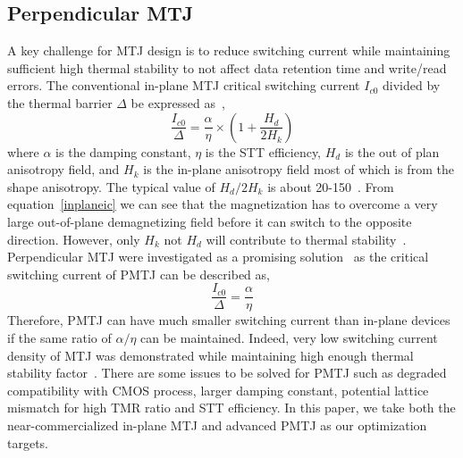 \subsection{Perpendicular MTJ} \label{subsec:pmtj}
A key challenge for MTJ design is to reduce switching current while maintaining sufficient high thermal stability to not affect data retention time and write/read errors. The conventional in-plane MTJ critical switching current $I_{c0}$ divided by the thermal barrier $\Delta$ be expressed as~\cite{PMTJ:Grandis10},
\begin{equation}
\frac{I_{c0}}{\Delta} = \frac{\alpha}{\eta} \times (1+\frac{H_{d}}{2H_{k}})
\label{inplaneic}
\end{equation}
where $\alpha$ is the damping constant, $\eta$ is the STT efficiency, $H_{d}$ is the out of plan anisotropy field, and $H_{k}$ is the in-plane anisotropy field most of which is from the shape anisotropy. The typical value of $H_{d}/2H_{k}$ is about 20-150~\cite{STTRAM:Review10A}. From equation~\ref{inplaneic} we can see that the magnetization has to overcome a very large out-of-plane demagnetizing field before it can switch to the opposite direction. However, only $H_{k}$ not $H_{d}$ will contribute to thermal stability~\cite{PMTJ:Grandis10}. Perpendicular MTJ were investigated as a promising solution~\cite{PMTJ:APL06,PMTJ:Grandis10,PMTJ:Toshiba08,PMTJ:Xiaochun06} as the critical switching current of PMTJ can be described as,
\begin{equation}
\frac{I_{c0}}{\Delta} = \frac{\alpha}{\eta}
\label{PMTJic}
\end{equation}
Therefore, PMTJ can have much smaller switching current than in-plane devices if the same ratio of $\alpha / \eta$ can be maintained. Indeed, very low switching current density of MTJ was demonstrated while maintaining high enough thermal stability factor~\cite{PMTJ:Toshiba08}. There are some issues to be solved for PMTJ such as degraded compatibility with CMOS process, larger damping constant, potential lattice mismatch for high TMR ratio and STT efficiency. In this paper, we take both the near-commercialized in-plane MTJ and advanced PMTJ as our optimization targets.







